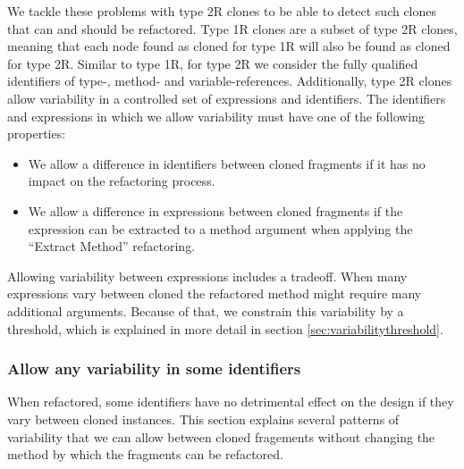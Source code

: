 We tackle these problems with type 2R clones to be able to detect such clones that can and should be refactored. Type 1R clones are a subset of type 2R clones, meaning that each node found as cloned for type 1R will also be found as cloned for type 2R. Similar to type 1R, for type 2R we consider the fully qualified identifiers of type-, method- and variable-references. Additionally, type 2R clones allow variability in a controlled set of expressions and identifiers. The identifiers and expressions in which we allow variability must have one of the following properties:
\begin{itemize}
  \item We allow a difference in identifiers between cloned fragments if it has no impact on the refactoring process.
  \item We allow a difference in expressions between cloned fragments if the expression can be extracted to a method argument when applying the ``Extract Method'' refactoring.
\end{itemize}

Allowing variability between expressions includes a tradeoff. When many expressions vary between cloned the refactored method might require many additional arguments. Because of that, we constrain this variability by a threshold, which is explained in more detail in section \ref{sec:variabilitythreshold}.%

\subsubsection{Allow any variability in some identifiers}
When refactored, some identifiers have no detrimental effect on the design if they vary between cloned instances. This section explains several patterns of variability that we can allow between cloned fragements without changing the method by which the fragments can be refactored.

